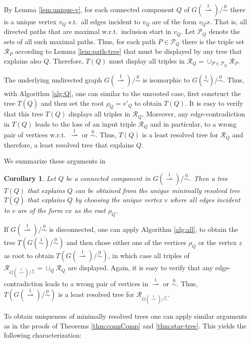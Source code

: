\documentclass[smallextended]{svjour3}
\newcommand{\rev}[1]{\begingroup\color{blue}#1\endgroup}
\newcommand{\TODO}[1]{\begingroup\color{red}#1\endgroup}
\newcommand{\Ro}{\mathrel{\overset{0}{\sim}}}
\newcommand{\Rl}{\mathrel{\overset{1}{\sim}}}
\newcommand{\Rld}{\mathrel{\overset{1}{\rightharpoonup}}}
\newtheorem{cor}[thm]{Corollary}
\begin{document}
By Lemma \ref{lem:unique-v}, for each connected component $Q$ of
$G(\Rld)/\Ro$ there is a unique vertex $v_Q$ s.t.\ all edges incident to
$v_Q$ are of the form $v_Qx$. That is, all directed paths that are maximal
w.r.t.\ inclusion start in $v_Q$.  Let $\mathcal P_Q$ denote the sets of
all such maximal paths.  Thus, for each path $P \in \mathcal P_Q$
there is the triple set $\mathcal{R}_{P}$ according to Lemma
\ref{lem:path-tree} that must be displayed by any tree that explains also
$Q$.  Therefore, $T(Q)$ must display all triples in $\mathcal{R}_Q =
\cup_{P\in \mathcal{P}_Q} \mathcal{R}_{P}$.

The underlying undirected graph $\underline{G(\Rld)/\Ro}$ is isomorphic to
$G(\Rl)/\Ro$. Thus, with Algorithm \ref{alg:Q}, one can similar to the
unrooted case, first construct the tree $T(\underline{Q})$ and then set the
root $\rho_Q=v'_Q$ to obtain $T(Q)$.  It is easy to verify that this tree
$T(Q)$ displays all triples in $\mathcal{R}_Q$.  Moreover, any
edge-contradiction in $T(Q)$ leads to the loss of an input triple
$\mathcal{R}_Q$ and in particular, to a wrong pair of vertices w.r.t.\
$\Rld$ or $\Ro$.  Thus, $T(Q)$ is a least resolved tree for
$\mathcal{R}_Q$ and therefore, a least resolved tree that explains $Q$.

We summarize these arguments in
\begin{cor} 
  Let $Q$ be a connected component in $G(\Rld)/\Ro$. \rev{Then a tree $T(Q)$ that explains $Q$ 
	can be  obtained from the unique minimally resolved tree $T(\underline{Q})$ 
  that explains $\underline{Q}$} by
  choosing the unique vertex $v$ where all edges incident to $v$ are of the
  form $vx$ as the root $\rho_Q$. %
\label{cor:Q-root}
\end{cor}

If $G(\Rld)/\Ro$ is disconnected, one can apply Algorithm \ref{alg:all}, to
obtain the tree $T(G(\Rl)/\Ro)$ and then chose either one of the vertices
$\rho_Q$ or the vertex $z$ as root to obtain $T(G(\Rld)/\Ro)$, in which
case all triples of $\mathcal{R}_{G(\Rld)/\Ro} = \cup_Q \mathcal R_Q$ are
displayed. Again, it is easy to verify that any edge-contradiction leads to
a wrong pair of vertices in $\Rld$ or $\Ro$. Thus, $T(G(\Rld)/\Ro)$ is a
least resolved tree for $\mathcal{R}_{G(\Rld)/\Ro}$.

To obtain uniqueness of minimally resolved trees 
one can apply similar arguments as in the proofs of
Theorems \ref{thm:connComp} and \ref{thm:star-tree}. This yields the
following characterization: %
\end{document}
